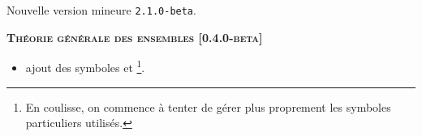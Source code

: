 Nouvelle version mineure \verb+2.1.0-beta+.




\begin{center}
    \textbf{\textsc{Théorie générale des ensembles [0.4.0-beta]}}
\end{center}

\begin{itemize}[itemsep=.5em]
    \item {}
          ajout des symboles  et  
          \footnote{
          	En coulisse, on commence à tenter de gérer plus proprement les symboles particuliers utilisés.
		  }.
\end{itemize}


\separation
